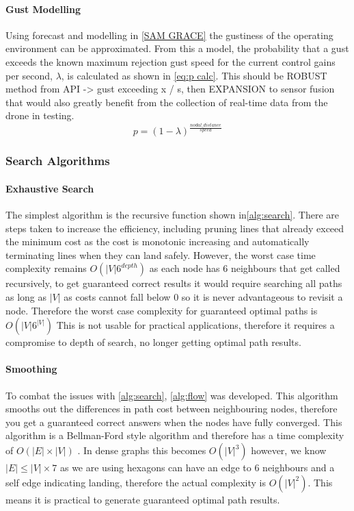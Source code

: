 \paragraph{Gust Modelling}
Using forecast and modelling in \ref{SAM GRACE} the gustiness of the operating environment can be approximated. From this a model, the probability that a gust exceeds the known maximum rejection gust speed for the current control gains per second, $\lambda$, is calculated as shown in \ref{eq:p calc}. 
This should be ROBUST method from API -> gust exceeding x / s, then EXPANSION to sensor fusion that would also greatly benefit from the collection of real-time data from the drone in testing.
\begin{equation}\label{eq:p calc}
    p = (1-\lambda)^{\frac{nodal\_distance}{speed}}
\end{equation}

\subsubsection{Search Algorithms}


\paragraph{Exhaustive Search}
The simplest algorithm is the recursive function shown in\ref{alg:search}. There are steps taken to increase the efficiency, including pruning lines that already exceed the minimum cost as the cost is monotonic increasing and automatically terminating lines when they can land safely. However, the worst case time complexity remains $O(|V|6^{depth})$ as each node has 6 neighbours that get called recursively, to get guaranteed correct results it would require searching all paths as long as $|V|$ as costs cannot fall below 0 so it is never advantageous to revisit a node. Therefore the worst case complexity for guaranteed optimal paths is $O(|V|6^{|V|})$ This is not usable for practical applications, therefore it requires a compromise to depth of search, no longer getting optimal path results.
\paragraph{Smoothing}
To combat the issues with \ref{alg:search}, \ref{alg:flow} was developed. This algorithm smooths out the differences in path cost between neighbouring nodes, therefore you get a guaranteed correct answers when the nodes have fully converged. This algorithm is a Bellman-Ford style algorithm and therefore has a time complexity of $O(|E|\times |V|)$ \cite{REF}. In dense graphs this becomes  $O(|V|^3)$ however, we know $|E| \leq |V| \times 7$ as we are using hexagons can have an edge to 6 neighbours and a self edge indicating landing, therefore the actual complexity is $O(|V|^2)$. This means it is practical to generate guaranteed optimal path results.

